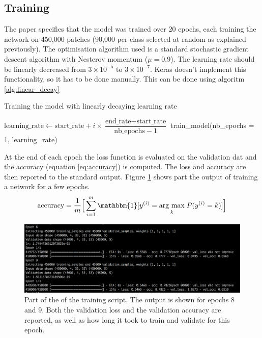 \documentclass[12pt,a4paper,twoside,openright]{report}
\newcommand{\argmax}[1]{\underset{#1}{\operatorname{arg}\,\operatorname{max}}\;} %
\begin{document}
\subsection{Training}
The paper specifies that the model was trained over 20 epochs, each training the network on 450,000 patches (90,000 per class selected at random as explained previously). The optimisation algorithm used is a standard stochastic gradient descent algorithm with Nesterov momentum ($\mu = 0.9$). The learning rate should be linearly decreased from $3 \times 10^{-5}$ to $3 \times 10^{-7}$. Keras doesn't implement this functionality, so it has to be done manually. This can be done using algoritm \ref{alg:linear_decay}

\begin{algorithm}
\caption{Training the model with linearly decaying learning rate}\label{alg:linear_decay}
\begin{algorithmic}[1]
	\State $\text{learning\_rate} \gets \text{start\_rate} + i \times \dfrac{\text{end\_rate} - \text{start\_rate} }{ \text{nb\_epochs} - 1 }$
	\State train\_model(nb\_epochs = 1, learning\_rate)
\EndFor
\end{algorithmic}
\end{algorithm}

At the end of each epoch the loss function is evaluated on the validation dat and the accuracy (equation \ref{eq:accuracy}) is computed. The loss and accuracy are then reported to the standard output. Figure \ref{fig:training_output} shows part the output of training a network for a few epochs.
\begin{equation}
	\label{eq:accuracy}
		\text{accuracy} = 
	\frac{1}{m}\Big[\sum_{i=1}^m\mathbbm{1}[y^{(i)} = \argmax{k}P(y^{(i)}=k)]\Big]
\end{equation}
\begin{figure}[h]
	\centering
	\includegraphics[width=\textwidth]{training_output}
	\caption[Part of the output of the training script]{Part of the of the training script. The output is shown for epochs 8 and 9. Both the validation loss and the validation accuracy are reported, as well as how long it took to train and validate for this epoch.}
	\label{fig:training_output}
\end{figure}
\end{document}
